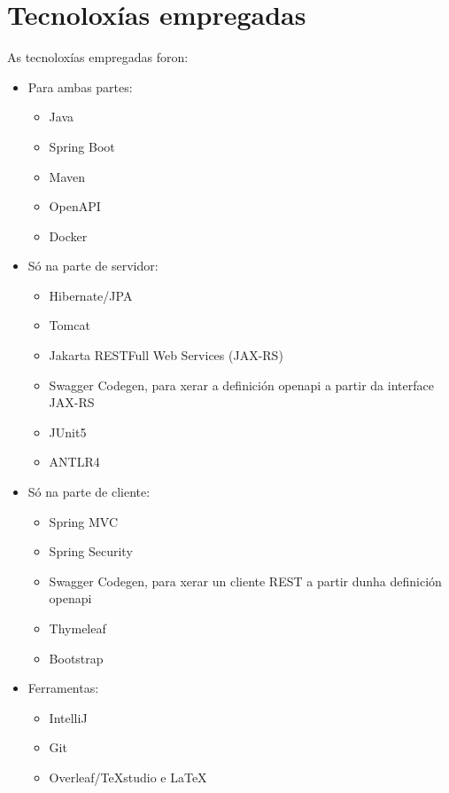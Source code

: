 \chapter{Tecnoloxías empregadas}
\label{chap:tecnoloxias}

As tecnoloxías empregadas foron:

\begin{itemize}
    \item Para ambas partes:
        \begin{itemize}
            \item Java
            \item Spring Boot
            \item Maven
            \item OpenAPI
            \item Docker
        \end{itemize}
    \item Só na parte de servidor:
        \begin{itemize}
            \item Hibernate/JPA
            \item Tomcat
            \item Jakarta RESTFull Web Services (JAX-RS)
            \item Swagger Codegen, para xerar a definición \Gls{openapi} a partir da interface JAX-RS
            \item JUnit5
            \item ANTLR4
        \end{itemize}
    \item Só na parte de cliente:
        \begin{itemize}
            \item Spring MVC
            \item Spring Security
            \item Swagger Codegen, para xerar un cliente REST a partir dunha definición \Gls{openapi}
            \item Thymeleaf
            \item Bootstrap
        \end{itemize}
    \item Ferramentas:
    	\begin{itemize}
    		\item IntelliJ
    		\item Git
    		\item Overleaf/TeXstudio e \LaTeX
    	\end{itemize}
\end{itemize}

